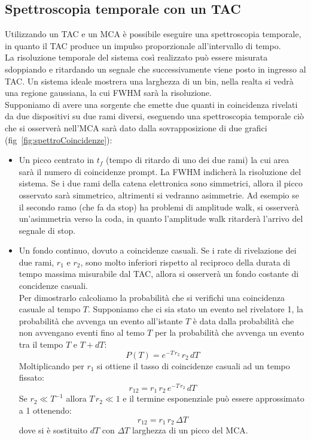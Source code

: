 \subsection{Spettroscopia temporale con un TAC}
Utilizzando un TAC e un MCA \`e possibile eseguire una spettroscopia temporale, in quanto il TAC produce un impulso proporzionale all'intervallo di tempo.\\
La risoluzione temporale del sistema cos\`i realizzato pu\`o essere misurata sdoppiando e ritardando un segnale che successivamente viene posto in ingresso al TAC.
Un sistema ideale mostrera una larghezza di un bin, nella realta si vedr\`a una regione gaussiana, la cui FWHM sar\`a la risoluzione.\\
Supponiamo di avere una sorgente che emette due quanti in coincidenza rivelati da due dispositivi su due rami diversi, eseguendo una spettroscopia temporale ci\`o che si osserver\`a nell'MCA sar\`a dato dalla sovrapposizione
di due grafici (fig~\ref{fig:spettroCoincidenze}):
\begin{itemize}
\item Un picco centrato in $t_f$ (tempo di ritardo di uno dei due rami) la cui area sar\`a il numero di coincidenze prompt. 
La FWHM indicher\`a la risoluzione del sistema. 
Se i due rami della catena elettronica sono simmetrici, allora il picco osservato sar\`a simmetrico, altrimenti si vedranno asimmetrie.
Ad esempio se il secondo ramo (che fa da stop) ha problemi di amplitude walk, si osserver\`a un'asimmetria verso la coda, in quanto l'amplitude walk ritarder\`a l'arrivo del segnale di stop.
\item Un fondo continuo, dovuto a coincidenze casuali. Se i rate di rivelazione dei due rami, $r_1$ e $r_2$, sono molto inferiori rispetto al reciproco della durata di tempo massima
misurabile dal TAC, allora si osserver\`a un fondo costante di concidenze casuali. \\
Per dimostrarlo calcoliamo la probabilit\`a che si verifichi una coincidenza casuale al tempo $T$.
Supponiamo che ci sia stato un evento nel rivelatore 1, la probabilit\`a che avvenga un evento all'istante $T$ \`e data dalla probabilit\`a
che non avvengano eventi fino al temo $T$ per la probabilit\`a che avvenga un evento tra il tempo $T$ e $T+dT$:
\begin{equation*}
P(T) = e^{-T \, r_2} \, r_2 \, dT
\end{equation*}
Moltiplicando per $r_1$ si ottiene il tasso di coincidenze casuali ad un tempo fissato:
\begin{equation*}
r_{12}=r_1\, r_2 \, e^{-T \, r_2} \, dT
\end{equation*}
Se $r_2\ll T^{-1}$ allora $T\,r_2 \ll 1$ e il termine esponenziale pu\`o essere approssimato a 1 ottenendo:
\begin{equation*}
r_{12} = r_1 \, r_2 \, \Delta T
\end{equation*} 
dove si \`e sostituito $dT$ con $\Delta T$ larghezza di un picco del MCA.
\end{itemize}
